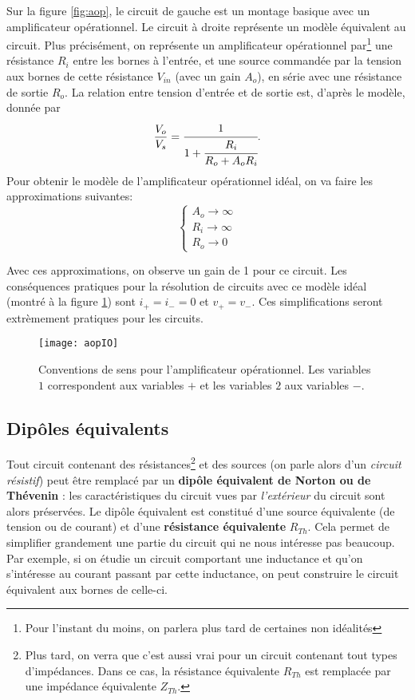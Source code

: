 Sur la figure \ref{fig:aop}, le circuit de gauche est un montage basique avec un amplificateur opérationnel. Le circuit à droite représente un modèle équivalent au circuit. Plus précisément, on représente un amplificateur opérationnel par\footnote{Pour l'instant du moins, on parlera plus tard de certaines non idéalités} une résistance $R_i$ entre les bornes à l'entrée, et une source commandée par la tension aux bornes de cette résistance $V_{in}$ (avec un gain $A_o$), en série avec une résistance de sortie $R_o$. La relation entre tension d'entrée et de sortie est, d'après le modèle, donnée par $$\frac{V_o}{V_s} = \cfrac{1}{1+\cfrac{R_i}{R_o + A_oR_i}}.$$
Pour obtenir le modèle de l'amplificateur opérationnel idéal, on va faire les approximations suivantes:
$$\left\{ \begin{array}{c}
A_o \longrightarrow \infty\\
R_i \longrightarrow \infty\\
R_o \longrightarrow 0
\end{array}\right. $$

Avec ces approximations, on observe un gain de 1 pour ce circuit. Les conséquences pratiques pour la résolution de circuits avec ce modèle idéal (montré à la figure \ref{fig:aopIO}) sont $\boxed{i_+ = i_- = 0}$ et $\boxed{v_+ = v_-}$. Ces simplifications seront extrèmement pratiques pour les circuits.

\begin{figure}[h]
\centering
\texttt{[image: aopIO]}
\caption{Conventions de sens pour l'amplificateur opérationnel. Les variables $1$ correspondent aux variables $+$ et les variables $2$ aux variables $-$.}
\label{fig:aopIO}
\end{figure}

\subsection{Dipôles équivalents}
\label{dipoles}
Tout circuit contenant des résistances\footnote{Plus tard, on verra que c'est aussi vrai pour un circuit contenant tout types d'impédances. Dans ce cas, la résistance équivalente $R_{Th}$ est remplacée par une impédance équivalente $Z_{Th}$.} et des sources (on parle alors d'un \textit{circuit résistif}) peut être remplacé par un \textbf{dipôle équivalent de Norton ou de Thévenin} : les caractéristiques du circuit vues par \textit{l'extérieur} du circuit sont alors préservées. Le dipôle équivalent est constitué d'une source équivalente (de tension ou de courant) et d'une \textbf{résistance équivalente} $R_{Th}$.  Cela permet de simplifier grandement une partie du circuit qui ne nous intéresse pas beaucoup. Par exemple, si on étudie un circuit comportant une inductance et qu'on s'intéresse au courant passant par cette inductance, on peut construire le circuit équivalent aux bornes de celle-ci.

